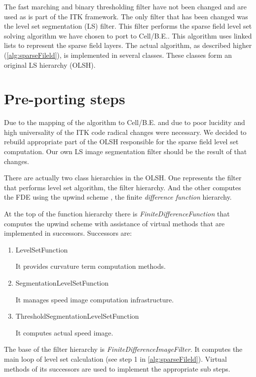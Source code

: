 The fast marching and binary thresholding filter have not been changed and are used as is part of the ITK framework.
The only filter that has been changed was the level set segmentation (LS) filter.
This filter performs the sparse field level set solving algorithm we have chosen to port to \mbox{Cell/B.E.}.
This algorithm uses linked lists to represent the sparse field layers.
The actual algorithm, as described higher (\ref{alg:sparseFileld}), is implemented in several classes.
These classes form an original LS hierarchy (OLSH).

\section{Pre-porting steps}
\par
Due to the mapping of the algorithm to \mbox{Cell/B.E.} and due to poor lucidity and high universality of the ITK code radical changes were necessary.
We decided to rebuild appropriate part of the OLSH responsible for the sparse field level set computation.
Our own LS image segmentation filter should be the result of that changes.

\par
There are actually two class hierarchies in the OLSH.
One represents the filter that performs level set algorithm, the filter hierarchy.
And the other computes the FDE using the upwind scheme \cite{sethianLS}, the finite \emph{difference function} hierarchy.

\par
At the top of the function hierarchy there is \mbox{\emph{FiniteDifferenceFunction}} that computes the upwind scheme with assistance of virtual methods that are implemented in successors.
Successors are:
\begin{enumerate}
  \item{LevelSetFunction}
  \par
  It provides curvature term computation methods.

\item{SegmentationLevelSetFunction}
\par
  It manages speed image computation infrastructure.

\item{ThresholdSegmentationLevelSetFunction}
\par
It computes actual speed image.
\end{enumerate}

\par
The base of the filter hierarchy is \mbox{\emph{FiniteDifferenceImageFilter}}.
It computes the main loop of level set calculation (see step 1 in \ref{alg:sparseFileld}).
Virtual methods of its successors are used to implement the appropriate sub steps.


